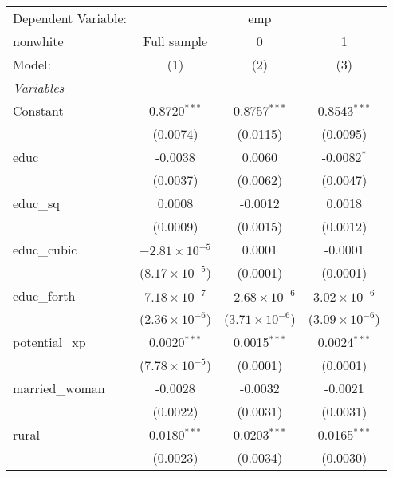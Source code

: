 \begingroup
\centering
\begin{tabular}{lccc}
   \tabularnewline \midrule \midrule
   Dependent Variable: & \multicolumn{3}{c}{emp}\\
   nonwhite        & Full sample             & 0                       & 1 \\   
   Model:          & (1)                     & (2)                     & (3)\\  
   \midrule
   \emph{Variables}\\
   Constant        & 0.8720$^{***}$          & 0.8757$^{***}$          & 0.8543$^{***}$\\   
                   & (0.0074)                & (0.0115)                & (0.0095)\\   
   educ            & -0.0038                 & 0.0060                  & -0.0082$^{*}$\\   
                   & (0.0037)                & (0.0062)                & (0.0047)\\   
   educ\_sq        & 0.0008                  & -0.0012                 & 0.0018\\   
                   & (0.0009)                & (0.0015)                & (0.0012)\\   
   educ\_cubic     & $-2.81\times 10^{-5}$   & 0.0001                  & -0.0001\\   
                   & ($8.17\times 10^{-5}$)  & (0.0001)                & (0.0001)\\   
   educ\_forth     & $7.18\times 10^{-7}$    & $-2.68\times 10^{-6}$   & $3.02\times 10^{-6}$\\    
                   & ($2.36\times 10^{-6}$)  & ($3.71\times 10^{-6}$)  & ($3.09\times 10^{-6}$)\\    
   potential\_xp   & 0.0020$^{***}$          & 0.0015$^{***}$          & 0.0024$^{***}$\\   
                   & ($7.78\times 10^{-5}$)  & (0.0001)                & (0.0001)\\   
   married\_woman  & -0.0028                 & -0.0032                 & -0.0021\\   
                   & (0.0022)                & (0.0031)                & (0.0031)\\   
   rural           & 0.0180$^{***}$          & 0.0203$^{***}$          & 0.0165$^{***}$\\   
                   & (0.0023)                & (0.0034)                & (0.0030)\\   

\end{tabular}
